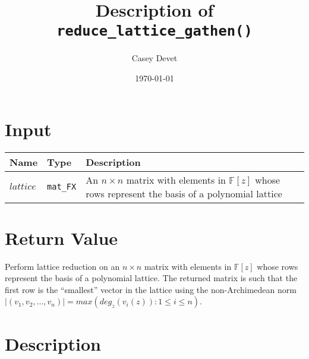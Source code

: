 \documentclass[10pt]{article}
\newcommand{\barred}[1]
	{\left| #1 \right|}
\newcommand{\paren}[1]
	{\left( #1 \right)}
\begin{document}
\pagestyle{fancy}


\setlength{\parindent}{0pt}


\title{\textbf{Description of \texttt{reduce\_lattice\_gathen()}}}
\date{\today}
\author{Casey Devet}

\maketitle
\thispagestyle{fancy}

\setlength{\parskip}{12pt}

\section*{Input}

\begin{tabular}{p{1in}p{1in}p{4in}}
\textbf{Name} & \textbf{Type} & \textbf{Description} \\ \hline
$lattice$ & \texttt{mat\_FX} & An $n \times n$ matrix with elements in $\mathbb{F}[z]$ whose rows represent 
											the basis of a polynomial lattice \\
\end{tabular}

\section*{Return Value}

Perform lattice reduction on an $n \times n$ matrix with elements in
$\mathbb{F}[z]$ whose rows represent the basis of a polynomial lattice.
The returned matrix is such that the first row is the ``smallest''
vector in the lattice using the non-Archimedean norm
$\barred{\paren{v_1,v_2,...,v_n}} = max\paren{deg_z\paren{v_i(z)} : 1 \leq i \leq n}$.

\section*{Description}
\end{document}
